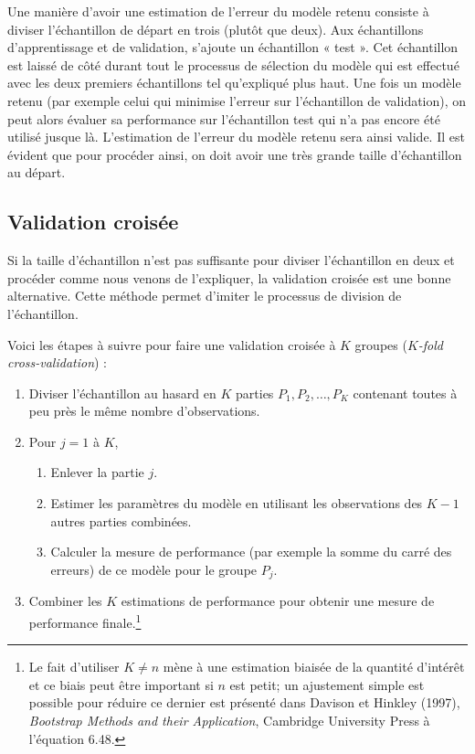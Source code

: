 \documentclass[
  11pt,
  letterpaper,
]{scrbook}
\providecommand{\tightlist}{%
  \setlength{\itemsep}{0pt}\setlength{\parskip}{0pt}}\usepackage{longtable,booktabs,array}
\theoremstyle{definition}
\theoremstyle{remark}
\begin{document}
Une manière d'avoir une estimation de l'erreur du modèle retenu consiste
à diviser l'échantillon de départ en trois (plutôt que deux). Aux
échantillons d'apprentissage et de validation, s'ajoute un échantillon «
test ». Cet échantillon est laissé de côté durant tout le processus de
sélection du modèle qui est effectué avec les deux premiers échantillons
tel qu'expliqué plus haut. Une fois un modèle retenu (par exemple celui
qui minimise l'erreur sur l'échantillon de validation), on peut alors
évaluer sa performance sur l'échantillon test qui n'a pas encore été
utilisé jusque là. L'estimation de l'erreur du modèle retenu sera ainsi
valide. Il est évident que pour procéder ainsi, on doit avoir une très
grande taille d'échantillon au départ.

\hypertarget{validation-croisuxe9e}{%
\subsection{Validation croisée}\label{validation-croisuxe9e}}

Si la taille d'échantillon n'est pas suffisante pour diviser
l'échantillon en deux et procéder comme nous venons de l'expliquer, la
validation croisée est une bonne alternative. Cette méthode permet
d'imiter le processus de division de l'échantillon.

Voici les étapes à suivre pour faire une validation croisée à \(K\)
groupes (\emph{\(K\)-fold cross-validation}) :

\begin{enumerate}
\def\labelenumi{\arabic{enumi}.}
\tightlist
\item
  Diviser l'échantillon au hasard en \(K\) parties
  \(P_1, P_2, \ldots, P_K\) contenant toutes à peu près le même nombre
  d'observations.
\item
  Pour \(j = 1\) à \(K\),

  \begin{enumerate}
  \def\labelenumii{\roman{enumii}.}
  \tightlist
  \item
    Enlever la partie \(j\).
  \item
    Estimer les paramètres du modèle en utilisant les observations des
    \(K-1\) autres parties combinées.
  \item
    Calculer la mesure de performance (par exemple la somme du carré des
    erreurs) de ce modèle pour le groupe \(P_j\).
  \end{enumerate}
\item
  Combiner les \(K\) estimations de performance pour obtenir une mesure
  de performance finale.\footnote{Le fait d'utiliser \(K \neq n\) mène à
    une estimation biaisée de la quantité d'intérêt et ce biais peut
    être important si \(n\) est petit; un ajustement simple est possible
    pour réduire ce dernier est présenté dans Davison et Hinkley (1997),
    \emph{Bootstrap Methods and their Application}, Cambridge University
    Press à l'équation 6.48.}
\end{enumerate}
\end{document}
